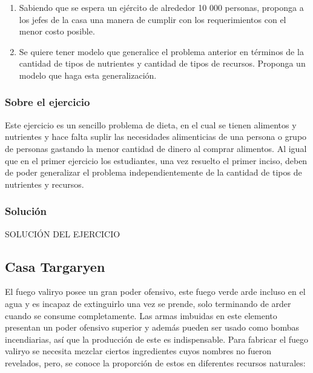 \documentclass[a4paper,10pt,twocolumn]{article}
\theoremstyle{theorem}
\theoremstyle{definition}
\theoremstyle{remark}
\begin{document}
\renewcommand{\theenumi}{\alph{enumi}} %

\begin{enumerate}

	\item Sabiendo que se espera un ejército de alrededor 10 000 personas, proponga a los jefes de la casa una manera de cumplir con los 
	requerimientos con el menor costo posible.
	\item Se quiere tener modelo que generalice el problema anterior en términos de la cantidad de tipos de nutrientes y cantidad de tipos de 
	recursos. Proponga un modelo que haga esta generalización.

\end{enumerate}

		\subsubsection{Sobre el ejercicio}\label{subsubsec:sobre_ejer_2}

Este ejercicio es un sencillo problema de dieta, en el cual se tienen alimentos y nutrientes y hace falta suplir las necesidades alimenticias de una persona o grupo de personas gastando la menor cantidad de dinero al comprar alimentos. Al igual que en el primer ejercicio los estudiantes, una vez resuelto el primer inciso, deben de poder generalizar el problema independientemente de la cantidad de tipos de nutrientes y recursos.

		\subsubsection{Solución}\label{subsubsec:sol_ejer_2}

SOLUCIÓN DEL EJERCICIO

	\subsection{Casa Targaryen}\label{subsec:ejer_3}
El fuego valiryo posee un gran poder ofensivo, este fuego verde arde incluso en el agua y es incapaz de extinguirlo una vez se prende, solo terminando de arder cuando se consume completamente. Las armas imbuidas en este elemento presentan un poder ofensivo superior y además pueden ser usado como bombas incendiarias, así que la producción de este es indispensable. Para fabricar el fuego valiryo se necesita mezclar ciertos ingredientes cuyos nombres no fueron revelados, pero, se conoce la proporción de estos en diferentes recursos naturales:
\end{document}
